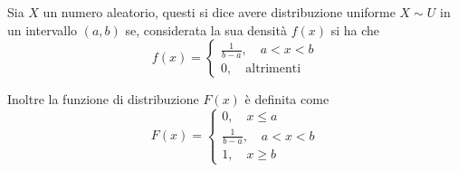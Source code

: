 \documentclass{subfiles}
\begin{document}
Sia \(X\) un numero aleatorio, questi si dice avere distribuzione uniforme \(X \sim U\) in un intervallo \((a, b)\) se, considerata la sua densità \(f(x)\) si ha che
\[
    f(x) = \begin{cases}
        \frac{1}{b - a}, \quad a < x < b \\
        0, \quad \text{altrimenti}
    \end{cases}\]

Inoltre la funzione di distribuzione \(F(x)\) è definita come
\[
    F(x) = \begin{cases}
        0, \quad x \le a                 \\
        \frac{1}{b - a}, \quad a < x < b \\
        1, \quad x \ge b
    \end{cases}\]
\end{document}
